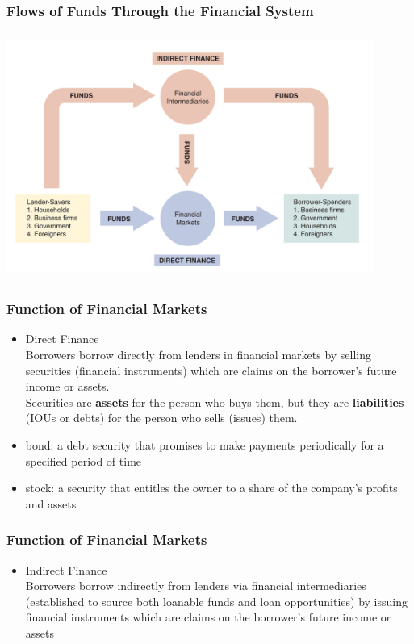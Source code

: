 \documentclass{beamer}
\begin{document}

\frame
{
\frametitle{Flows of Funds Through the Financial System}
\centering \includegraphics[height=8cm,width=12cm]{Picture1}
}
\begin{frame}
\frametitle{Function of Financial Markets}
\begin{itemize}
\item Direct Finance \\
\smallskip
Borrowers borrow directly from lenders in financial markets by selling securities (financial instruments) which are claims on the borrower's future income or assets. \\
Securities are \textbf{assets} for the person who buys them, but they are \textbf{liabilities} (IOUs or debts) for the person who sells (issues) them. 
\smallskip
\item bond: a debt security that promises to make payments periodically for a specified period of time
\item stock: a security that entitles the owner to a share of the company's profits and assets
\end{itemize}
\end{frame}


\begin{frame}
\frametitle{Function of Financial Markets}
\begin{itemize}
\item Indirect Finance \\
\smallskip
Borrowers borrow indirectly from lenders via financial intermediaries (established to source both loanable funds and loan opportunities) by issuing financial instruments which are claims on the borrower's future income or assets

\end{itemize}
\end{frame}
\end{document}
